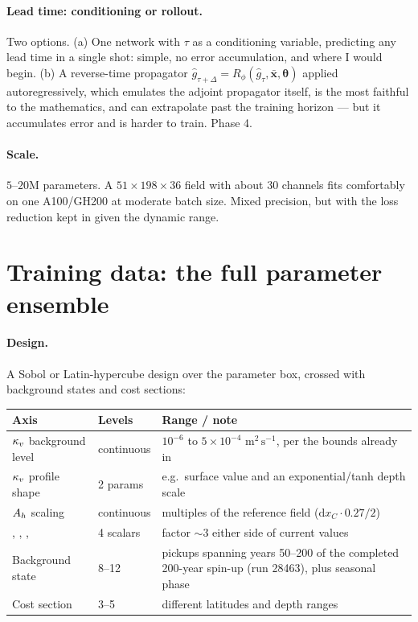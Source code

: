 \paragraph{Lead time: conditioning or rollout.}
Two options. (a) One network with $\tau$ as a conditioning variable, predicting
any lead time in a single shot: simple, no error accumulation, and where I would
begin. (b) A reverse-time propagator
$\hat{g}_{\tau+\Delta}=R_\phi(\hat{g}_\tau,\bar{\mathbf{x}},\boldsymbol{\theta})$
applied autoregressively, which emulates the adjoint propagator itself, is the
most faithful to the mathematics, and can extrapolate past the training
horizon --- but it accumulates error and is harder to train. Phase 4.

\paragraph{Scale.} $5$--$20$M parameters. A $51\times198\times36$ field with
about $30$ channels fits comfortably on one A100/GH200 at moderate batch size.
Mixed precision, but with the loss reduction kept in  given the
dynamic range.

\section{Training data: the full parameter ensemble}
\label{sec:trainingdata}

\paragraph{Design.}
A Sobol or Latin-hypercube design over the parameter box, crossed with
background states and cost sections:

\begin{center}
\begin{tabularx}{\textwidth}{@{}Y{0.85}Y{0.55}Y{1.6}@{}}
\toprule
\textbf{Axis} & \textbf{Levels} & \textbf{Range / note}\\
\midrule
$\kappa_{v}$ background level & continuous & $10^{-6}$ to $5\times10^{-4}$
  $\mathrm{m^{2}\,s^{-1}}$, per the  bounds already in
  \\
$\kappa_{v}$ profile shape & 2 params & e.g.\ surface value and an
  exponential/tanh depth scale\\
$A_{h}$ scaling & continuous & multiples of the reference
   field ($\mathrm{d}x_C\cdot0.27/2$)\\
, , ,
   & 4 scalars & factor $\sim\!3$ either side of current values\\
Background state & 8--12 & pickups spanning years 50--200 of the completed
  200-year spin-up (run 28463), plus seasonal phase\\
Cost section & 3--5 & different latitudes and depth ranges\\
\bottomrule
\end{tabularx}
\end{center}

